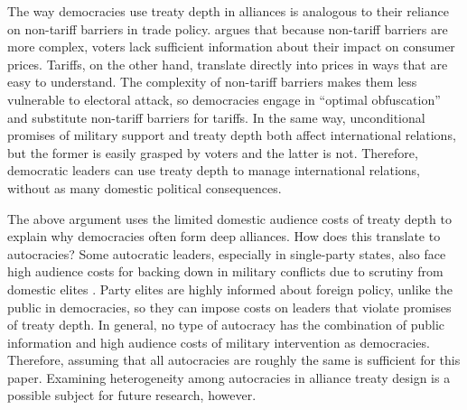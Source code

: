 \documentclass[12pt]{article}
\begin{document}
The way democracies use treaty depth in alliances is analogous to their reliance on non-tariff barriers in trade policy.
\citet{Kono2006} argues that because non-tariff barriers are more complex, voters lack sufficient information about their impact on consumer prices.
Tariffs, on the other hand, translate directly into prices in ways that are easy to understand.
The complexity of non-tariff barriers makes them less vulnerable to electoral attack, so democracies engage in ``optimal obfuscation'' and substitute non-tariff barriers for tariffs. 
In the same way, unconditional promises of military support and treaty depth both affect international relations, but the former is easily grasped by voters and the latter is not. 
Therefore, democratic leaders can use treaty depth to manage international relations, without as many domestic political consequences.


 


The above argument uses the limited domestic audience costs of treaty depth to explain why democracies often form deep alliances. 
How does this translate to autocracies? 
Some autocratic leaders, especially in single-party states, also face high audience costs for backing down in military conflicts due to scrutiny from domestic elites \citep{Weeks2014}. 
Party elites are highly informed about foreign policy, unlike the public in democracies, so they can impose costs on leaders that violate promises of treaty depth. 
In general, no type of autocracy has the combination of public information and high audience costs of military intervention as democracies.
Therefore, assuming that all autocracies are roughly the same is sufficient for this paper. 
Examining heterogeneity among autocracies in alliance treaty design is a possible subject for future research, however. 
\end{document}
